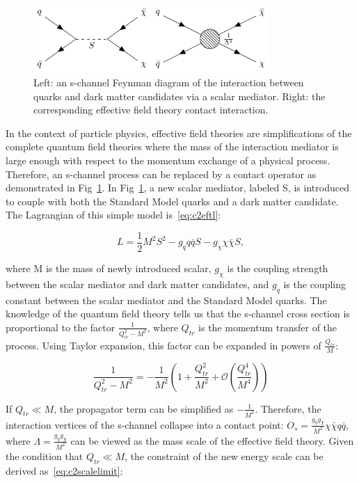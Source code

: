 \begin{figure}[htbp]
    \centering
    \includegraphics[width=0.8\textwidth]{chapters/c2/figures/eft-feyn-diagram}
    \caption{Left: an s-channel Feynman diagram of the interaction between quarks and dark matter candidates via a scalar mediator. Right: the corresponding effective field theory contact interaction.}
    \label{fig:c2eftfeyndiagram}
\end{figure}

In the context of particle physics, effective field theories are simplifications of the complete quantum field theories where the mass of the interaction mediator is large enough with respect to the momentum exchange of a physical process. Therefore, an s-channel process can be replaced by a contact operator as demonstrated in Fig~\ref{fig:c2eftfeyndiagram}. In Fig~\ref{fig:c2eftfeyndiagram}, a new scalar mediator, labeled S, is introduced to couple with both the Standard Model quarks and a dark matter candidate. The Lagrangian of this simple model is~\ref{eq:c2eftl}:

\begin{equation}
  L = \frac{1}{2}M^{2}S^{2}-g_{q}q\bar{q}S-g_{\chi}\chi\bar{\chi}S,
  \label{eq:c2eftl}
\end{equation}

where M is the mass of newly introduced scalar, $g_{\chi}$ is the coupling strength between the scalar mediator and dark matter candidates, and $g_{q}$ is the coupling constant between the scalar mediator and the Standard Model quarks. The knowledge of the quantum field theory tells us that the s-channel cross section is proportional to the factor $\frac{1}{Q_{tr}^{2}-M^{2}}$, where $Q_{tr}$ is the momentum transfer of the process. Using Taylor expansion, this factor can be expanded in powers of $\frac{Q_{tr}}{M}$: 

\begin{equation}
  \frac{1}{Q^{2}_{tr}-M^{2}} = -\frac{1}{M^{2}}(1+\frac{Q^{2}_{tr}}{M^{2}}+\mathcal{O}(\frac{Q^{4}_{tr}}{M^{4}}))
  \label{eq:c2taylorexp}
\end{equation}

If $Q_{tr} \ll M$, the propagator term can be simplified as $-\frac{1}{M^2}$. Therefore, the interaction vertices of the s-channel collapse into a contact point: $O_{s}=\frac{g_{q}g_{\chi}}{M^{2}}\chi\bar{\chi}q\bar{q}$, where $\Lambda=\frac{g_{q}g_{\chi}}{M^{2}}$ can be viewed as the mass scale of the effective field theory. Given the condition that $Q_{tr} \ll M$, the constraint of the new energy scale can be derived as~\ref{eq:c2scalelimit}:

